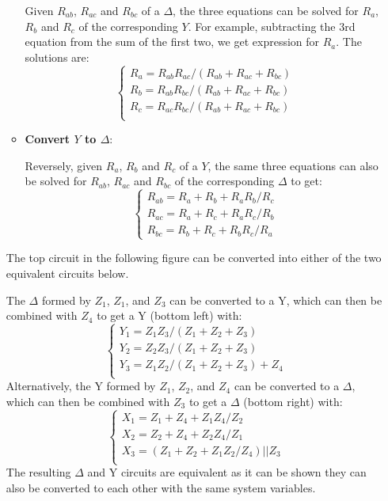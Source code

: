 \begin{itemize}
\begin{itemize}
    Given $R_{ab}$, $R_{ac}$ and $R_{bc}$ of a $\Delta$, the three equations 
    can be solved for $R_a$, $R_b$ and $R_c$ of the corresponding $Y$. For 
    example, subtracting the 3rd equation from the sum of the first two, we 
    get expression for $R_a$. The solutions are:
    \[ \left\{ \begin{array}{rr}
      R_a=R_{ab}R_{ac}/(R_{ab}+R_{ac}+R_{bc}) \\
      R_b=R_{ab}R_{bc}/(R_{ab}+R_{ac}+R_{bc}) \\
      R_c=R_{ac}R_{bc}/(R_{ab}+R_{ac}+R_{bc}) \\
    \end{array} \right. \]

  \item {\bf Convert $Y$ to $\Delta$}: 

    Reversely, given $R_a$, $R_b$ and $R_c$ of a $Y$, the same three 
    equations can also be solved for $R_{ab}$, $R_{ac}$ and $R_{bc}$ of
    the corresponding $\Delta$ to get:
    \[ \left\{ \begin{array}{rr}
      R_{ab}=R_a+R_b+R_aR_b/R_c	\\
      R_{ac}=R_a+R_c+R_aR_c/R_b	\\
      R_{bc}=R_b+R_c+R_bR_c/R_a	\end{array} \right. \]
\end{itemize}

The top circuit in the following figure can be converted into either 
of the two equivalent circuits below.


The $\Delta$ formed by $Z_1$, $Z_1$, and $Z_3$ can
be converted to a Y, which can then be combined with $Z_4$ to get 
a Y (bottom left) with:
\[ \left\{ \begin{array}{l}
  Y_1=Z_1Z_3/(Z_1+Z_2+Z_3) \\
  Y_2=Z_2Z_3/(Z_1+Z_2+Z_3) \\
  Y_3=Z_1Z_2/(Z_1+Z_2+Z_3)+Z_4 \\
\end{array} \right. \]
Alternatively, the Y formed by $Z_1$, $Z_2$, and $Z_4$ can
be converted to a $\Delta$, which can then be combined with $Z_3$ 
to get a $\Delta$ (bottom right) with:
\[ \left\{ \begin{array}{l}
  X_1=Z_1+Z_4+Z_1Z_4/Z_2 \\
  X_2=Z_2+Z_4+Z_2Z_4/Z_1 \\
  X_3=(Z_1+Z_2+Z_1Z_2/Z_4) || Z_3 \\
\end{array} \right. \]
The resulting $\Delta$ and Y circuits are equivalent as
it can be shown they can also be converted to each other with the
same system variables.


\end{itemize}

